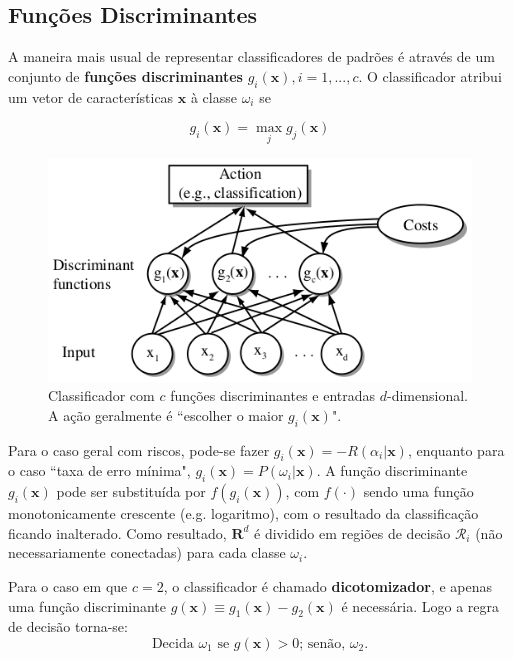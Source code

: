 \documentclass[a4paper,12pt,twocolumn]{article}
\begin{document}
\subsection{Funções Discriminantes}

A maneira mais usual de representar classificadores de padrões é através de um conjunto de \textbf{funções discriminantes} $g_i(\mathbf{x}), i = 1, ..., c$. O classificador atribui um vetor de características $\mathbf{x}$ à classe $\omega_i$ se

\begin{equation}
    g_i(\mathbf{x}) = \max_j g_j(\mathbf{x})
    \label{eq:discriminant_functions}
\end{equation}

\begin{figure}[ht]
    \centering
    \includegraphics[scale=0.45]{discriminant_functions}
    \caption{Classificador com $c$ funções discriminantes e entradas $d$-dimensional. A ação geralmente é ``escolher o maior $g_i(\mathbf{x})$".}
    \label{fig:discriminant_functions}
\end{figure}

Para o caso geral com riscos, pode-se fazer $g_i(\mathbf{x}) = - R(\alpha_i|\mathbf{x})$, enquanto para o caso ``taxa de erro mínima", $g_i(\mathbf{x}) = P(\omega_i|\mathbf{x})$. A função discriminante $g_i(\mathbf{x})$ pode ser substituída por $f(g_i(\mathbf{x}))$, com $f(\cdot)$ sendo uma função monotonicamente crescente (e.g. logaritmo), com o resultado da classificação ficando inalterado. Como resultado, $\mathbf{R}^d$ é dividido em regiões de decisão $\mathcal{R}_i$ (não necessariamente conectadas) para cada classe $\omega_i$.

Para o caso em que $c = 2$, o classificador é chamado \textbf{dicotomizador}, e apenas uma função discriminante $g(\mathbf{x}) \equiv g_1(\mathbf{x}) - g_2(\mathbf{x})$ é necessária. Logo a regra de decisão torna-se:
\begin{equation}
    \text{Decida } \omega_1 \text{ se } g(\mathbf{x}) > 0 \text {; senão, } \omega_2.
    \label{eq:decision_4}
\end{equation}
\end{document}
